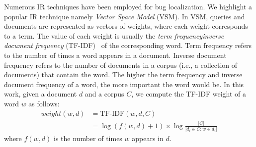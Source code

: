 Numerous IR techniques have been employed for bug localization. We highlight a popular IR technique namely \emph{Vector Space Model} (VSM). In VSM, queries and documents are represented as vectors of weights, where each weight corresponds to a term. The value of each weight is usually the \textit{term frequency\textemdash inverse document frequency} (TF-IDF)~\cite{Ramos1999} of the corresponding word. Term frequency refers to the number of times a word appears in a document. Inverse document frequency refers to the number of documents in a corpus (i.e., a collection of documents) that contain the word. The higher the term frequency and inverse document frequency of a word, the more important the word would be. In this work, given a document $d$ and a corpus $C$, we compute the TF-IDF weight of a word $w$ as follows:
\begin{align}
weight(w,d) &= \text{TF-IDF}(w,d,C) \nonumber\\
            &= \log(f(w,d)+1) \times \log\frac{|C|}{|{d_i\in C : w \in d_i }|} \nonumber
\end{align}
where $f(w,d)$ is the number of times $w$ appears in $d$.



%
%



